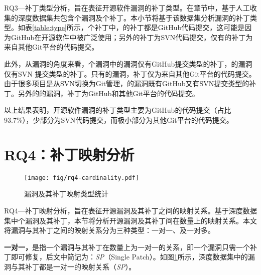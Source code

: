RQ3---补丁类型分析，旨在表征开源软件漏洞的补丁类型。在章节\tocheck{\ref{sec:preparation}}中，基于人工收集的深度数据集共包含个漏洞及个补丁。本小节将基于该数据集分析漏洞的补丁类型。如表\ref{table:type}所示，个补丁中，的补丁都是GitHub代码提交，这可能是因为GitHub在开源软件中被广泛使用；另外的补丁为SVN代码提交，仅有的补丁为来自其他Git平台的代码提交。

此外，从漏洞的角度来看，个漏洞中的漏洞仅有GitHub提交类型的补丁，的漏洞仅有SVN 提交类型的补丁。只有的漏洞，补丁仅为来自其他Git平台的代码提交。由于很多项目是从SVN切换为Git管理，的漏洞既有GitHub又有SVN提交类型的补丁。另外的的漏洞，补丁为GitHub和其他Git平台的代码提交。

以上结果表明，开源软件漏洞的补丁类型主要为GitHub的代码提交（占比93.7\%），少部分为SVN代码提交，而极小部分为其他Git平台的代码提交。

\section{RQ4：补丁映射分析}\label{sec:cardinality}
\begin{figure}[h]
\centering
\texttt{[image: fig/rq4-cardinality.pdf]}
\vspace{-10pt}
\caption{漏洞及其补丁映射类型统计}\label{fig:rq4-cardinality}
\end{figure}

RQ4---补丁映射分析，旨在表征开源漏洞及其补丁之间的映射关系。基于深度数据集中个漏洞及其补丁，本节将分析开源漏洞及其补丁间在数量上的映射关系。本文将漏洞与其补丁之间的映射关系分为三种类型：一对一、及一对多。

\textbf{一对一，}是指一个漏洞与其补丁在数量上为一对一的关系，即一个漏洞只需一个补丁即可修复，后文中简记为：\textit{SP}（Single Patch）。如图\ref{fig:rq4-cardinality}所示，深度数据集中的漏洞与其补丁都是一对一的映射关系（\textit{SP}）。

